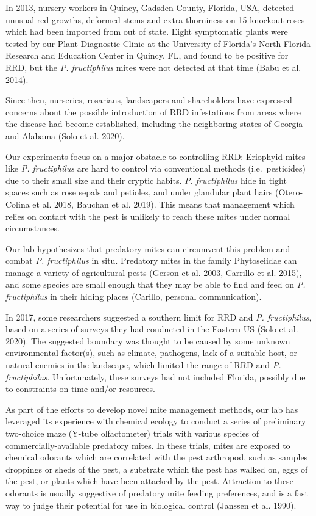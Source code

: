 \documentclass[12pt,final,CPage]{ufthesis}
\begin{document}
{  In 2013, nursery workers in Quincy, Gadsden County, Florida, USA, detected unusual red growths, deformed stems and extra thorniness on 15 knockout roses which had been imported from out of state. Eight symptomatic plants were tested by our Plant Diagnostic Clinic at the University of Florida's North Florida Research and Education Center in Quincy, FL, and found to be positive for RRD, but the \emph{P. fructiphilus} mites were not detected at that time (Babu et al. 2014).

  Since then, nurseries, rosarians, landscapers and shareholders have expressed concerns about the possible introduction of RRD infestations from areas where the disease had become established, including the neighboring states of Georgia and Alabama (Solo et al. 2020).

  Our experiments focus on a major obstacle to controlling RRD: Eriophyid mites like \emph{P. fructiphilus} are hard to control via conventional methods (i.e.~pesticides) due to their small size and their cryptic habits. \emph{P. fructiphilus} hide in tight spaces such as rose sepals and petioles, and under glandular plant hairs (Otero-Colina et al. 2018, Bauchan et al. 2019). This means that management which relies on contact with the pest is unlikely to reach these mites under normal circumstances.

  Our lab hypothesizes that predatory mites can circumvent this problem and combat \emph{P. fructiphilus} in situ. Predatory mites in the family Phytoseiidae can manage a variety of agricultural pests (Gerson et al. 2003, Carrillo et al. 2015), and some species are small enough that they may be able to find and feed on \emph{P. fructiphilus} in their hiding places (Carillo, personal communication).

  In 2017, some researchers suggested a southern limit for RRD and \emph{P. fructiphilus}, based on a series of surveys they had conducted in the Eastern US (Solo et al. 2020). The suggested boundary was thought to be caused by some unknown environmental factor(s), such as climate, pathogens, lack of a suitable host, or natural enemies in the landscape, which limited the range of RRD and \emph{P. fructiphilus}. Unfortunately, these surveys had not included Florida, possibly due to constraints on time and/or resources.

  As part of the efforts to develop novel mite management methods, our lab has leveraged its experience with chemical ecology to conduct a series of preliminary two-choice maze (Y-tube olfactometer) trials with various species of commercially-available predatory mites. In these trials, mites are exposed to chemical odorants which are correlated with the pest arthropod, such as samples droppings or sheds of the pest, a substrate which the pest has walked on, eggs of the pest, or plants which have been attacked by the pest. Attraction to these odorants is usually suggestive of predatory mite feeding preferences, and is a fast way to judge their potential for use in biological control (Janssen et al. 1990).

}
\end{document}
